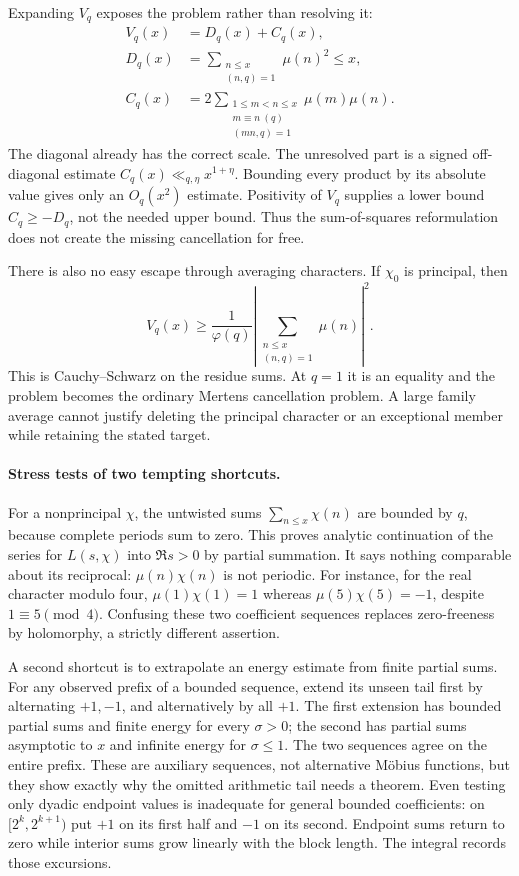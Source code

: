 \documentclass[11pt]{article}
\begin{document}
Expanding $V_q$ exposes the problem rather than resolving it:
\begin{align*}
 V_q(x)&=D_q(x)+C_q(x),\\
 D_q(x)&=\sum_{\substack{n\le x\\(n,q)=1}}\mu(n)^2\le x,\\
 C_q(x)&=2\sum_{\substack{1\le m<n\le x\\m\equiv n\ (q)\\(mn,q)=1}}
                    \mu(m)\mu(n).
\end{align*}
The diagonal already has the correct scale. The unresolved part is a
signed off-diagonal estimate $C_q(x)\ll_{q,\eta}x^{1+\eta}$.
Bounding every product by its absolute value gives only an $O_q(x^2)$
estimate. Positivity of $V_q$ supplies a lower bound $C_q\ge-D_q$,
not the needed upper bound. Thus the sum-of-squares reformulation does
not create the missing cancellation for free.

There is also no easy escape through averaging characters. If $\chi_0$
is principal, then
\[
 V_q(x)\ge\frac1{\varphi(q)}
       \left|\sum_{\substack{n\le x\\(n,q)=1}}\mu(n)\right|^2.
\]
This is Cauchy--Schwarz on the residue sums. At $q=1$ it is an equality
and the problem becomes the ordinary Mertens cancellation problem.
A large family average cannot justify deleting the principal character
or an exceptional member while retaining the stated target.

\paragraph{Stress tests of two tempting shortcuts.}
For a nonprincipal $\chi$, the untwisted sums $\sum_{n\le x}\chi(n)$
are bounded by $q$, because complete periods sum to zero. This proves
analytic continuation of the series for $L(s,\chi)$ into $\Re s>0$
by partial summation. It says nothing comparable about its reciprocal:
$\mu(n)\chi(n)$ is not periodic. For instance, for the real character
modulo four, $\mu(1)\chi(1)=1$ whereas $\mu(5)\chi(5)=-1$, despite
$1\equiv5\pmod4$. Confusing these two coefficient sequences replaces
zero-freeness by holomorphy, a strictly different assertion.

A second shortcut is to extrapolate an energy estimate from finite
partial sums. For any observed prefix of a bounded sequence, extend its
unseen tail first by alternating $+1,-1$, and alternatively by all $+1$.
The first extension has bounded partial sums and finite energy for every
$\sigma>0$; the second has partial sums asymptotic to $x$ and infinite
energy for $\sigma\le1$. The two sequences agree on the entire prefix.
These are auxiliary sequences, not alternative M\"obius functions, but
they show exactly why the omitted arithmetic tail needs a theorem.
Even testing only dyadic endpoint values is inadequate for general bounded
coefficients: on $[2^k,2^{k+1})$ put $+1$ on its first half and $-1$
on its second. Endpoint sums return to zero while interior sums grow
linearly with the block length. The integral records those excursions.
\end{document}
